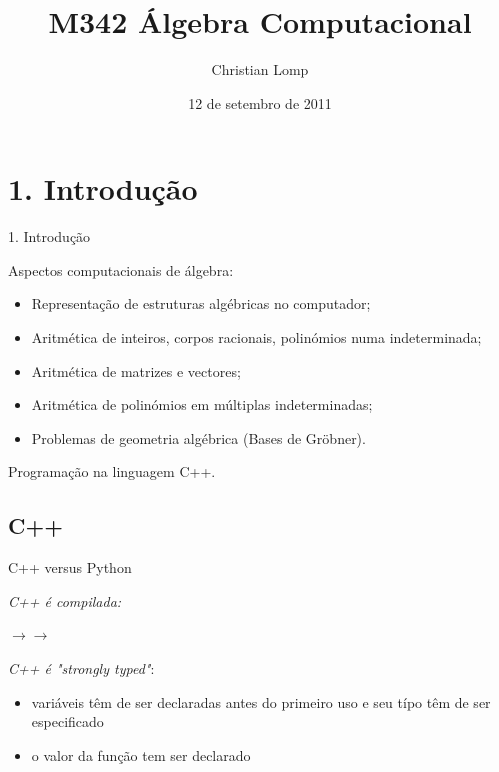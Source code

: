\documentclass[hyperref={colorlinks=true}]{beamer}
\title[M342]{M342 Álgebra Computacional}
\author{Christian Lomp}
\institute{FCUP}
\date{12 de setembro de 2011}
\begin{document}
\begin{frame}
\titlepage
\end{frame}

\section{1. Introdução}
\begin{frame}{1. Introdução}

 Aspectos computacionais de álgebra:

 \begin{itemize}
  \item\pause Representação de estruturas algébricas no computador;
  \item\pause Aritmética de  inteiros, corpos racionais, polinómios numa indeterminada;
  \item\pause Aritmética de matrizes e vectores;
  \item\pause Aritmética de polinómios em múltiplas indeterminadas;
  \item\pause Problemas de geometria algébrica (Bases de Gröbner).
 \end{itemize}
\pause Programação na linguagem C++. 
\end{frame}

\subsection{C++}
\begin{frame}{C++ versus Python}

{\it C++ é compilada:} 
\begin{center}$\longrightarrow$$\longrightarrow$ \end{center}

{\it C++ é "strongly typed"}: 
\begin{center} \begin{itemize} \item variáveis têm de ser declaradas antes do primeiro uso e seu típo têm de ser especificado \item o valor da função tem ser declarado \end{itemize}\end{center}

\end{frame}
\end{document}
